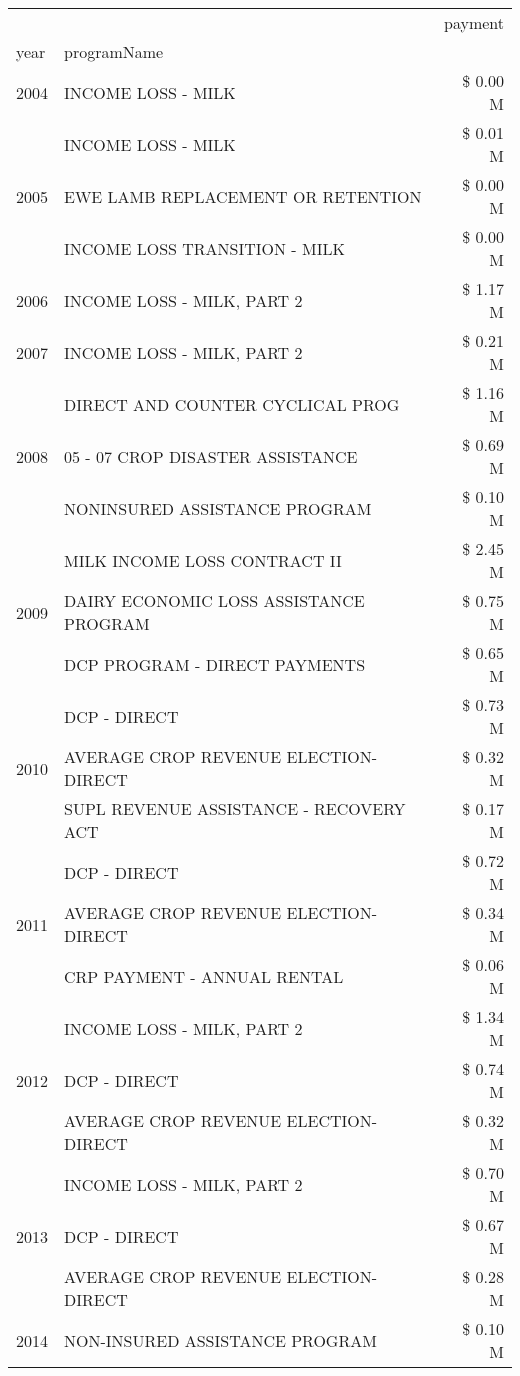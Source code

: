 \begin{tabular}{llr}
\toprule
 &  & payment \\
year & programName &  \\
\midrule
2004 & INCOME LOSS - MILK & \$ 0.00 M \\
\cline{1-3}
\multirow[t]{3}{*}{2005} & INCOME LOSS - MILK & \$ 0.01 M \\
 & EWE LAMB REPLACEMENT OR RETENTION & \$ 0.00 M \\
 & INCOME LOSS TRANSITION - MILK & \$ 0.00 M \\
\cline{1-3}
2006 & INCOME LOSS - MILK, PART 2 & \$ 1.17 M \\
\cline{1-3}
2007 & INCOME LOSS - MILK, PART 2 & \$ 0.21 M \\
\cline{1-3}
\multirow[t]{3}{*}{2008} & DIRECT AND COUNTER CYCLICAL PROG & \$ 1.16 M \\
 & 05 - 07 CROP DISASTER ASSISTANCE & \$ 0.69 M \\
 & NONINSURED ASSISTANCE PROGRAM & \$ 0.10 M \\
\cline{1-3}
\multirow[t]{3}{*}{2009} & MILK INCOME LOSS CONTRACT II & \$ 2.45 M \\
 & DAIRY ECONOMIC LOSS ASSISTANCE PROGRAM & \$ 0.75 M \\
 & DCP PROGRAM - DIRECT PAYMENTS & \$ 0.65 M \\
\cline{1-3}
\multirow[t]{3}{*}{2010} & DCP - DIRECT & \$ 0.73 M \\
 & AVERAGE CROP REVENUE ELECTION-DIRECT & \$ 0.32 M \\
 & SUPL REVENUE ASSISTANCE - RECOVERY ACT & \$ 0.17 M \\
\cline{1-3}
\multirow[t]{3}{*}{2011} & DCP - DIRECT & \$ 0.72 M \\
 & AVERAGE CROP REVENUE ELECTION-DIRECT & \$ 0.34 M \\
 & CRP PAYMENT - ANNUAL RENTAL & \$ 0.06 M \\
\cline{1-3}
\multirow[t]{3}{*}{2012} & INCOME LOSS - MILK, PART 2 & \$ 1.34 M \\
 & DCP - DIRECT & \$ 0.74 M \\
 & AVERAGE CROP REVENUE ELECTION-DIRECT & \$ 0.32 M \\
\cline{1-3}
\multirow[t]{3}{*}{2013} & INCOME LOSS - MILK, PART 2 & \$ 0.70 M \\
 & DCP - DIRECT & \$ 0.67 M \\
 & AVERAGE CROP REVENUE ELECTION-DIRECT & \$ 0.28 M \\
\cline{1-3}
\multirow[t]{3}{*}{2014} & NON-INSURED ASSISTANCE PROGRAM & \$ 0.10 M \\

\end{tabular}
